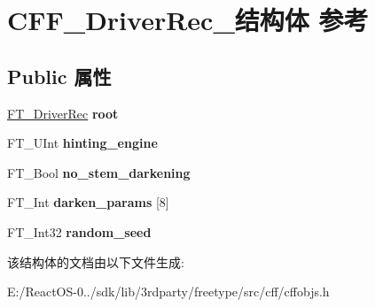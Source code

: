 \hypertarget{struct_c_f_f___driver_rec__}{}\section{C\+F\+F\+\_\+\+Driver\+Rec\+\_\+结构体 参考}
\label{struct_c_f_f___driver_rec__}
\subsection*{Public 属性}
\begin{DoxyCompactItemize}
\item 
\mbox{\label{struct_c_f_f___driver_rec___af205f61710887b57a41aa39daf294f10}} 
\hyperlink{struct_f_t___driver_rec__}{F\+T\+\_\+\+Driver\+Rec} {\bfseries root}
\item 
\mbox{\label{struct_c_f_f___driver_rec___a0be810c07afaadb1774e19c9600ab042}} 
F\+T\+\_\+\+U\+Int {\bfseries hinting\+\_\+engine}
\item 
\mbox{\label{struct_c_f_f___driver_rec___a0a36c622218da1efcaacadff8150b8a6}} 
F\+T\+\_\+\+Bool {\bfseries no\+\_\+stem\+\_\+darkening}
\item 
\mbox{\label{struct_c_f_f___driver_rec___ad16eaa0416335b27310a84acfd75363b}} 
F\+T\+\_\+\+Int {\bfseries darken\+\_\+params} \mbox{[}8\mbox{]}
\item 
\mbox{\label{struct_c_f_f___driver_rec___a3d895faaffdeb1e862cd9fe65f255c28}} 
F\+T\+\_\+\+Int32 {\bfseries random\+\_\+seed}
\end{DoxyCompactItemize}


该结构体的文档由以下文件生成\+:\begin{DoxyCompactItemize}
\item 
E\+:/\+React\+O\+S-\/0../sdk/lib/3rdparty/freetype/src/cff/cffobjs.\+h\end{DoxyCompactItemize}
